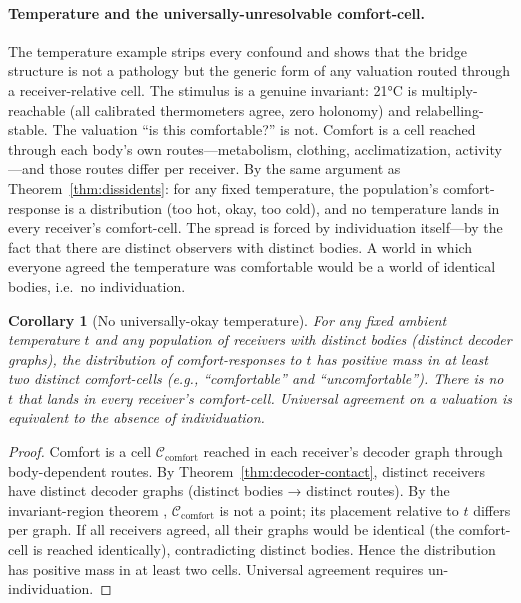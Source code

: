 \documentclass[twocolumn,11pt,a4paper]{article}
\theoremstyle{adv}
\newtheorem{corollary}[theorem]{Corollary}
\theoremstyle{definition}
\theoremstyle{remark}
\newcommand{\Cell}{\mathcal{C}}        %
\begin{document}
\paragraph{Temperature and the universally-unresolvable comfort-cell.}
The temperature example strips every confound and shows that the bridge
structure is not a pathology but the generic form of any valuation routed
through a receiver-relative cell. The stimulus is a genuine invariant: 21°C
is multiply-reachable (all calibrated thermometers agree, zero holonomy) and
relabelling-stable. The valuation ``is this comfortable?'' is not. Comfort is
a cell reached through each body's own routes---metabolism, clothing,
acclimatization, activity---and those routes differ per receiver. By the same
argument as Theorem~\ref{thm:dissidents}: for any fixed temperature, the
population's comfort-response is a distribution (too hot, okay, too cold),
and no temperature lands in every receiver's comfort-cell. The spread is
forced by individuation itself---by the fact that there are distinct observers
with distinct bodies. A world in which everyone agreed the temperature was
comfortable would be a world of identical bodies, i.e.\ no individuation.

\begin{corollary}[No universally-okay temperature]
\label{cor:temperature}
For any fixed ambient temperature $t$ and any population of receivers with
distinct bodies (distinct decoder graphs), the distribution of
comfort-responses to $t$ has positive mass in at least two distinct
comfort-cells (e.g., ``comfortable'' and ``uncomfortable''). There is no $t$
that lands in every receiver's comfort-cell. Universal agreement on a
valuation is equivalent to the absence of individuation.
\end{corollary}

\begin{proof}
Comfort is a cell $\Cell_\mathrm{comfort}$ reached in each receiver's
decoder graph through body-dependent routes. By Theorem~\ref{thm:decoder-contact},
distinct receivers have distinct decoder graphs (distinct bodies → distinct
routes). By the invariant-region theorem \citep{sachikonye2025contact},
$\Cell_\mathrm{comfort}$ is not a point; its placement relative to $t$
differs per graph. If all receivers agreed, all their graphs would be
identical (the comfort-cell is reached identically), contradicting distinct
bodies. Hence the distribution has positive mass in at least two cells.
Universal agreement requires un-individuation.
\end{proof}
\end{document}
